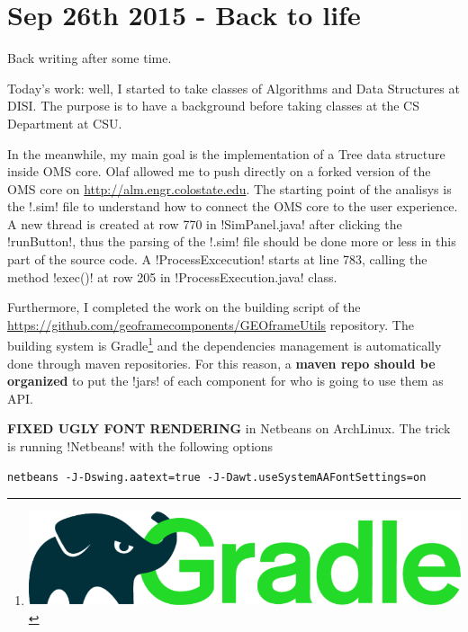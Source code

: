 \section{Sep 26th 2015 - Back to life}

Back writing after some time.

Today's work: well, I started to take classes of Algorithms and Data
Structures at DISI. The purpose is to have a background before taking
classes at the CS Department at CSU.\par\medskip

In the meanwhile, my main goal is the implementation of a Tree data
structure inside OMS core. Olaf allowed me to push directly on a
forked version of the OMS core on
\url{http://alm.engr.colostate.edu}. The starting point of the
analisys is the \inline!.sim! file to understand how to connect the
OMS core to the user experience. A new thread is created at row 770 in
\inline!SimPanel.java! after clicking the \inline!runButton!, thus the
parsing of the \inline!.sim! file should be done more or less in this
part of the source code. A \inline!ProcessExcecution! starts at line
783, calling the method \inline!exec()! at row 205 in
\inline!ProcessExecution.java! class.

Furthermore, I completed the work on the building script of the
\url{https://github.com/geoframecomponents/GEOframeUtils}
repository. The building system is
Gradle\thanks{\includegraphics{gradle.png}} and the dependencies
management is automatically done through maven repositories. For this
reason, a \textbf{maven repo should be organized} to put the
\inline!jars! of each component for who is going to use them as
API.\par\medskip

\textbf{FIXED UGLY FONT RENDERING} in Netbeans on ArchLinux. The trick
is running \inline!Netbeans! with the following options

\begin{lstlisting}[style=bashStyle]
  netbeans -J-Dswing.aatext=true -J-Dawt.useSystemAAFontSettings=on
\end{lstlisting}%

